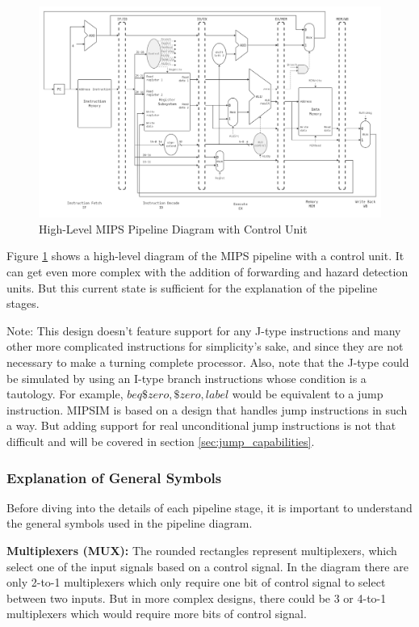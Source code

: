 \begin{figure}[H]
    \centering
    \includegraphics[width=1\textwidth]{assets/images/mips_pipeline.png}
    \caption{High-Level MIPS Pipeline Diagram with Control Unit}
    \label{fig:mips_pipeline}
\end{figure}

Figure \ref{fig:mips_pipeline} shows a high-level diagram of the MIPS pipeline with a control unit. It can get even more complex with the addition of forwarding and hazard detection units. But this current state is sufficient for the explanation of the pipeline stages.

Note: This design doesn't feature support for any J-type instructions and many other more complicated instructions for simplicity’s sake, and since they are not necessary to make a turning complete processor. Also, note that the J-type could be simulated by using an I-type branch instructions whose condition is a tautology. For example, $beq \$zero, \$zero, label$ would be equivalent to a jump instruction. MIPSIM is based on a design that handles jump instructions in such a way. But adding support for real unconditional jump instructions is not that difficult and will be covered in section \ref{sec:jump_capabilities}.



\subsubsection{Explanation of General Symbols}
Before diving into the details of each pipeline stage, it is important to understand the general symbols used in the pipeline diagram.

\textbf{Multiplexers (MUX):} The rounded rectangles represent multiplexers, which select one of the input signals based on a control signal. In the diagram there are only 2-to-1 multiplexers which only require one bit of control signal to select between two inputs. But in more complex designs, there could be 3 or 4-to-1 multiplexers which would require more bits of control signal.

